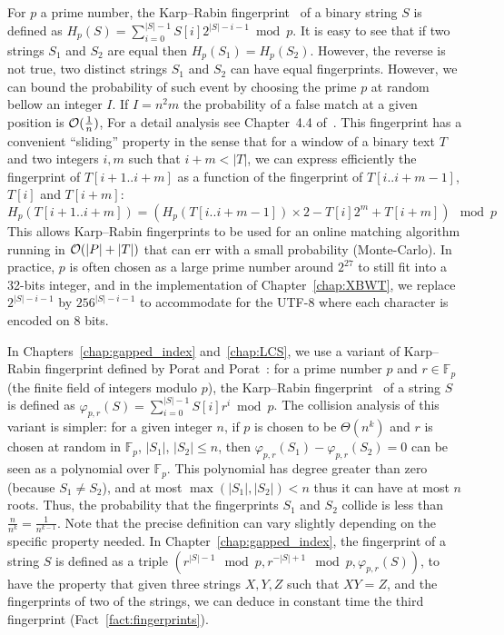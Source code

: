 For $p$ a prime number, the Karp--Rabin fingerprint~\cite{DBLP:journals/ibmrd/KarpR87} of a binary string $S$ is defined as
$H_{p}(S) = \sum_{i = 0}^{|S|-1}  S[i]2^{|S|-i-1} \bmod p$.
It is easy to see that if two strings $S_1$ and $S_2$ are equal then $H_p(S_1) = H_p(S_2)$. However, the reverse is not true, two distinct strings $S_1$ and $S_2$ can have equal fingerprints.
%
However, we can bound the probability of such event by choosing the prime $p$ at random bellow an integer $I$. If $I=n^2m$ the probability of a false match at a given position is $\mathcal{O}(\frac{1}{n})$, For a detail analysis see Chapter~4.4 of~\cite{Gusfield1997}.
This fingerprint has a convenient ``sliding'' property in the sense that for a window of a binary text $T$ and two integers $i,m$ such that $i+m < |T|$, we can express efficiently the fingerprint of $T[i+1..i+m]$ as a function of the fingerprint of $T[i..i+m-1]$, $T[i]$ and $T[i+m]$:
$$ H_{p}(T[i+1..i+m]) = ( H_{p}(T[i..i+m-1])\times 2 - T[i]2^{m} + T[i+m]  ) \mod p$$
This allows Karp--Rabin fingerprints to be used for an online matching algorithm running in $\mathcal{O}(|P|+|T|)$ that can err with a small probability (Monte-Carlo).
In practice, $p$ is often chosen as a large prime number around $2^{27}$ to still fit into a 32-bits integer, and in the implementation of Chapter~\ref{chap:XBWT}, we replace $2^{|S|-i-1}$ by $256^{|S|-i-1}$ to accommodate for the UTF-8 where each character is encoded on 8 bits.

In Chapters~\ref{chap:gapped_index} and~\ref{chap:LCS}, we use a variant of Karp--Rabin fingerprint defined by Porat and Porat~\cite{Porat:09}: 
for a prime number $p$  and $r \in \mathbb{F}_p$ (the finite field of integers modulo $p$), the Karp--Rabin fingerprint~\cite{DBLP:journals/ibmrd/KarpR87} of a string $S$ is defined as
$\varphi_{p,r}(S) = \sum_{i = 0}^{|S|-1}  S[i]r^{i} \bmod p$.
The collision analysis of this variant is simpler: %
for a given integer $n$, if $p$ is chosen to be $\Theta(n^k)$ and $r$ is chosen at random in $\mathbb{F}_p$, $|S_1|$, $|S_2|\leq n$, then $\varphi_{p,r}(S_1) - \varphi_{p,r}(S_2) = 0$ can be seen as a polynomial over $\mathbb{F}_p$. This polynomial has degree greater than zero (because $S_1 \neq S_2$), and at most $\max(|S_1|,|S_2|) < n$ thus it can have at most $n$ roots. Thus, the probability that the fingerprints $S_1$ and $S_2$ collide is less than $\frac{n}{n^k} = \frac{1}{n^{k-1}}$.
Note that the precise definition can vary slightly depending on the specific property needed. In Chapter~\ref{chap:gapped_index}, the fingerprint of a string $S$ is defined as a triple $(r^{|S|-1} \mod p, r^{-|S|+1} \mod p, \varphi_{p,r}(S))$, to have the property that given three strings $X,Y,Z$ such that $XY =Z$, and the fingerprints of two of the strings, we can deduce in constant time the third fingerprint (Fact~\ref{fact:fingerprints}). 


